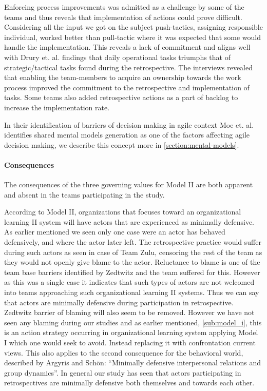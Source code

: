 Enforcing process improvements was admitted as a challenge by some of the teams and thus reveals that implementation of actions could prove difficult. Considering all the input we got on the subject push-tactics, assigning responsible individual, worked better than pull-tactic where it was expected that some would handle the implementation. This reveals a lack of commitment and aligns well with Drury et. al. \cite{Drury2012} findings that daily operational tasks triumphs that of strategic/tactical tasks found during the retrospective. The interviews revealed that enabling the team-members to acquire an ownership towards the work process improved the commitment to the retrospective and implementation of tasks. Some teams also added retrospective actions as a part of backlog to increase the implementation rate. 

In their identification of barriers of decision making in agile context Moe et. al. identifies shared mental models generation as one of the factors affecting agile decision making, we describe this concept more in \autoref{section:mental-models}. 

\paragraph{Consequences}
The consequences of the three governing values for Model II are both apparent and absent in the teams participating in the study.

According to Model II, organizations that focuses toward an organizational learning II system will have actors that are experienced as minimally defensive. As earlier mentioned we seen only one case were an actor has behaved defensively, and where the actor later left. The retrospective practice would suffer during such actors as seen in case of Team Zulu, censoring the rest of the team as they would not openly give blame to the actor. Reluctance to blame is one of the team base barriers identified by Zedtwitz\cite{Zedtwitz2002} and the team suffered for this. However as this was a single case it indicates that such types of actors are not welcomed into teams approaching such organizational learning II systems. Thus we can say that actors are minimally defensive during participation in retrospective. Zedtwitz barrier of blaming will also seem to be removed. However we have not seen any blaming during our studies and as earlier mentioned, \autoref{sub:model_i}, this is an action strategy occurring in organizational learning system applying Model I which one would seek to avoid. Instead replacing it with confrontation current views. This also applies to the second consequence for the behavioral world, described by Argyris and Schön: ``Minimally defensive interpersonal relations and group dynamics''. In general our study has seen that actors  participating in retrospectives are minimally defensive both themselves and towards each other. 

